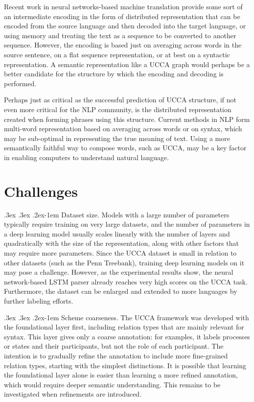 \documentclass[11pt]{article}
\makeatletter
\renewcommand{\paragraph}{
  \@startsection{paragraph}{4}
  {\z@}{.3ex \@plus .3ex \@minus .2ex}{-1em}
  {\normalfont\normalsize\bfseries}
}
\makeatother
\begin{document}
Recent work in neural networks-based machine translation provide some sort of
an intermediate encoding in the form of distributed representation that can be
encoded from the source language and then decoded into the target
language\cite{zou2013bilingual}, or using memory and treating the text as a
sequence to be converted to another sequence\cite{sutskever2014sequence}.
However, the encoding is based just on averaging across words in the source
sentence, on a flat sequence representation, or at best on a syntactic
representation. A semantic representation like a UCCA graph would perhaps be a
better candidate for the structure by which the encoding and decoding is
performed.

Perhaps just as critical as the successful prediction of UCCA structure, if not
even more critical for the NLP community, is the distributed representation
created when forming phrases using this structure. Current methods in NLP form
multi-word representation based on averaging across words or on syntax, which
may be sub-optimal in representing the true meaning of text. Using a more
semantically faithful way to compose words, such as UCCA, may be a key factor
in enabling computers to understand natural language.



\section{Challenges}\label{sec:challenges}

\paragraph{Dataset size.}
Models with a large number of parameters typically require training on very
large datasets, and the number of parameters in a deep learning model usually
scales linearly with the number of layers and quadratically with the size of
the representation, along with other factors that may require more parameters.
Since the UCCA dataset is small in relation to other datasets (such as the Penn
Treebank), training deep learning models on it may pose a challenge.
However, as the experimental results show, the neural network-based LSTM parser
already reaches very high scores on the UCCA task.
Furthermore, the dataset can be enlarged and extended to more languages by further
labeling efforts.


\paragraph{Scheme coarseness.}
The UCCA framework was developed with the foundational layer first, including
relation types that are mainly relevant for syntax. This layer gives only a
coarse annotation: for examples, it labels processes or states and their
participants, but not the role of each participant. The intention is to
gradually refine the annotation to include more fine-grained relation types,
starting with the simplest distinctions. It is possible that learning
the foundational layer alone is easier than learning a more
refined annotation, which would require deeper semantic understanding.
This remains to be investigated when refinements are introduced.
\end{document}
